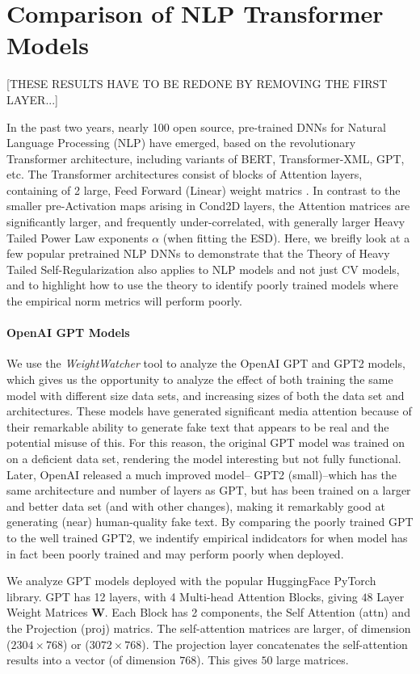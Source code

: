 \section{Comparison of NLP Transformer Models}
\label{sxn:nlp}

[THESE RESULTS HAVE TO BE REDONE BY REMOVING THE FIRST LAYER...]

In the past two years, nearly 100 open source, pre-trained DNNs for Natural Language Processing (NLP) have emerged,
based on the revolutionary Transformer architecture, including variants of BERT, Transformer-XML, GPT, etc.
The Transformer architectures consist of blocks of Attention layers, containing of 2 large, Feed Forward (Linear)
weight matrics \cite{Attn2017}. In contrast to the smaller pre-Activation maps arising in Cond2D layers,
the Attention matrices are significantly larger, and frequently under-correlated, with generally larger
Heavy Tailed Power Law exponents $\alpha$ (when fitting the ESD).  Here, we breifly look at a few
popular pretrained NLP DNNs to demonstrate that the Theory of Heavy Tailed Self-Regularization also
applies to NLP models and not just CV models, and to highlight how to use the theory to identify
poorly trained models where the empirical norm metrics will perform poorly.

\paragraph{OpenAI GPT Models}
We use the \emph{WeightWatcher} tool to analyze the OpenAI GPT and GPT2 models, which gives us
the opportunity to analyze the effect of both training the same model with different size data sets,
and increasing sizes of both the data set and architectures.
These models have generated significant media attention because of their remarkable ability to
 generate fake text that appears to be real and the potential misuse of this.
For this reason, the original GPT model was trained on on a deficient data set, rendering
the model interesting but not fully functional.  Later, OpenAI released a much improved model--
GPT2 (small)--which has the same architecture and number of layers as GPT, but has
been trained on a larger and better data set (and with other changes), making it
remarkably good at generating (near) human-quality fake text.  
By comparing the poorly trained GPT to the well trained GPT2, we
indentify empirical indidcators for when  model has in fact
been poorly trained and may perform poorly when deployed.

We analyze GPT models deployed with the popular HuggingFace PyTorch library.
GPT has 12 layers, with 4 Multi-head Attention Blocks, giving $48$ Layer Weight Matrices $\mathbf{W}$.
Each Block has 2 components, the Self Attention (attn) and the Projection (proj) matrics.  
The self-attention  matrices are larger, of dimension ($2304\times 768$) or ($3072\times 768$).
The projection layer concatenates the self-attention results into a vector (of dimension $768$).
This gives $50$ large matrices.

